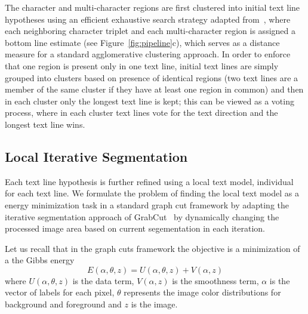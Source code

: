 \documentclass[conference]{IEEEtran}
\begin{document}
The character and multi-character regions are first clustered into initial text line hypotheses using an efficient exhaustive search strategy adapted from~\cite{Neumann-ICDAR11}, where each neighboring character triplet and each multi-character region is assigned a bottom line estimate (see Figure~\ref{fig:pipeline}c), which serves as a distance measure for a standard agglomerative clustering approach. In order to enforce that one region is present only in one text line, initial text lines are simply grouped into clusters based on presence of identical regions (two text lines are a member of the same cluster if they have at least one region in common) and then in each cluster only the longest text line is kept; this can be viewed as a voting process, where in each cluster text lines vote for the text direction and the longest text line wins.


\subsection{Local Iterative Segmentation}
\label{sec:localTextModel}

Each text line hypothesis is further refined using a local text model, individual for each text line. We formulate the problem of finding the local text model as a energy minimization task in a standard graph cut framework by adapting the iterative segmentation approach of GrabCut~\cite{rother2004grabcut} by dynamically changing the processed image area based on current segementation in each iteration.

Let us recall that in the graph cuts framework the objective is a minimization of a the Gibbs energy
\begin{equation}
E(\alpha, \theta, z) = U(\alpha,\theta,z) + V(\alpha, z)
\end{equation}
where $U(\alpha,\theta,z)$ is the data term, $V(\alpha, z)$ is the smoothness term, $\alpha$ is the vector of labels for each pixel, $\theta$ represents the image color distributions for background and foreground and $z$ is the image.
\end{document}

